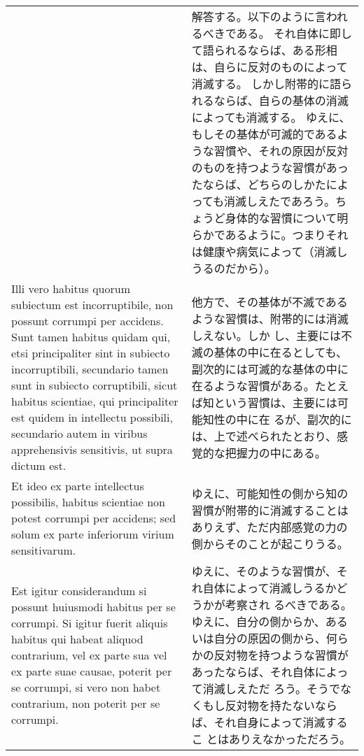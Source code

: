 \documentclass[10pt]{jsarticle} %
\begin{document}
\begin{longtable}{p{21em}p{21em}}
&

解答する。以下のように言われるべきである。
それ自体に即して語られるならば、ある形相は、自らに反対のものによって消滅する。
しかし附帯的に語られるならば、自らの基体の消滅によっても消滅する。
ゆえに、もしその基体が可滅的であるような習慣や、それの原因が反対のものを持つような習慣があったならば、どちらのしかたによっても消滅しえたであろう。ちょうど身体的な習慣について明らかであるように。つまりそれは健康や病気によって（消滅しうるのだから）。

\\


Illi vero habitus quorum subiectum est incorruptibile,
non possunt corrumpi per accidens. Sunt tamen habitus quidam qui, etsi
principaliter sint in subiecto incorruptibili, secundario tamen sunt
in subiecto corruptibili, sicut habitus scientiae, qui principaliter
est quidem in intellectu possibili, secundario autem in viribus
apprehensivis sensitivis, ut supra dictum est. 


&

他方で、その基体が不滅であるような習慣は、附帯的には消滅しえない。しか
し、主要には不滅の基体の中に在るとしても、副次的には可滅的な基体の中に
在るような習慣がある。たとえば知という習慣は、主要には可能知性の中に在
るが、副次的には、上で述べられたとおり、感覚的な把握力の中にある。


\\


Et ideo ex parte
intellectus possibilis, habitus scientiae non potest corrumpi per
accidens; sed solum ex parte inferiorum virium sensitivarum. 



&

ゆえに、可能知性の側から知の習慣が附帯的に消滅することはありえず、ただ内部感覚の力の側からそのことが起こりうる。

\\


Est
igitur considerandum si possunt huiusmodi habitus per se corrumpi. Si
igitur fuerit aliquis habitus qui habeat aliquod contrarium, vel ex
parte sua vel ex parte suae causae, poterit per se corrumpi, si vero
non habet contrarium, non poterit per se corrumpi. 


&

ゆえに、そのような習慣が、それ自体によって消滅しうるかどうかが考察され
るべきである。ゆえに、自分の側からか、あるいは自分の原因の側から、何ら
かの反対物を持つような習慣があったならば、それ自体によって消滅しえただ
ろう。そうでなくもし反対物を持たないならば、それ自身によって消滅するこ
とはありえなかっただろう。



\end{longtable}
\end{document}
